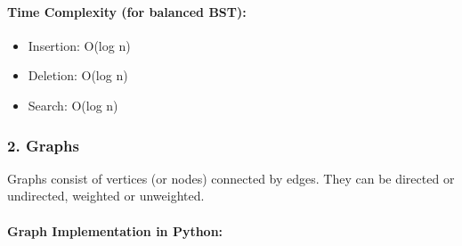 \begin{Shaded}
\begin{Highlighting}[]
\NormalTok{);}
\NormalTok{);}
\NormalTok{);}
\NormalTok{);}
\NormalTok{);}

     \NormalTok{;}
\NormalTok{\}}
\end{Highlighting}
\end{Shaded}

\hypertarget{time-complexity-for-balanced-bst}{%
\paragraph{Time Complexity (for balanced
BST):}\label{time-complexity-for-balanced-bst}}

\begin{itemize}
\tightlist
\item
  Insertion: O(log n)
\item
  Deletion: O(log n)
\item
  Search: O(log n)
\end{itemize}

\hypertarget{graphs}{%
\subsubsection{2. Graphs}\label{graphs}}

Graphs consist of vertices (or nodes) connected by edges. They can be
directed or undirected, weighted or unweighted.

\hypertarget{graph-implementation-in-python}{%
\paragraph{Graph Implementation in
Python:}\label{graph-implementation-in-python}}

